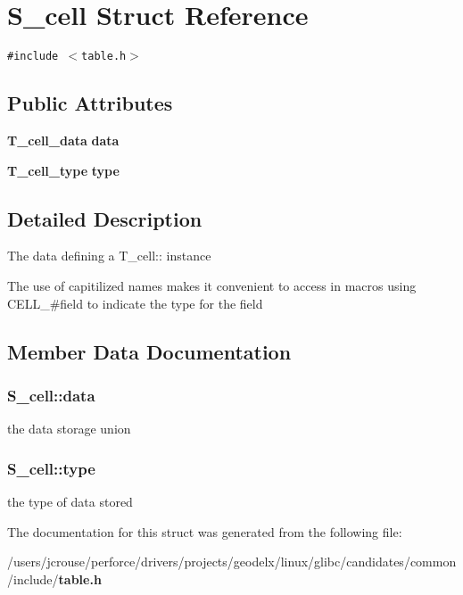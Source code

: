 \section{S\_\-cell Struct Reference}
\label{structS__cell}
{\tt \#include $<$table.h$>$}

\subsection*{Public Attributes}
\begin{CompactItemize}
\item 
{\bf T\_\-cell\_\-data} {\bf data}
\item 
{\bf T\_\-cell\_\-type} {\bf type}
\end{CompactItemize}


\subsection{Detailed Description}
The data defining a T\_\-cell:: instance

The use of capitilized names makes it convenient to access in macros using CELL\_\-\#field to indicate the type for the field 



\subsection{Member Data Documentation}
\subsubsection{ S\_\-cell::data}\label{structS__cell_m0}


the data storage union 
\subsubsection{ S\_\-cell::type}\label{structS__cell_m1}


the type of data stored 

The documentation for this struct was generated from the following file:\begin{CompactItemize}
\item 
/users/jcrouse/perforce/drivers/projects/geodelx/linux/glibc/candidates/common/include/{\bf table.h}\end{CompactItemize}
